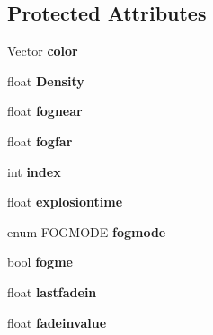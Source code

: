 \subsection*{Protected Attributes}
\begin{DoxyCompactItemize}
\item 
Vector {\bfseries color}\hypertarget{classNebula_a7b9933d103740ff9a5f5ccb587ff8bb7}{}\label{classNebula_a7b9933d103740ff9a5f5ccb587ff8bb7}

\item 
float {\bfseries Density}\hypertarget{classNebula_a65a694ecbd29a3d301b60ee90d693e55}{}\label{classNebula_a65a694ecbd29a3d301b60ee90d693e55}

\item 
float {\bfseries fognear}\hypertarget{classNebula_af826e90d2824b0609830a0f59bea4c34}{}\label{classNebula_af826e90d2824b0609830a0f59bea4c34}

\item 
float {\bfseries fogfar}\hypertarget{classNebula_a46fd435d45c344813d7ce37075083bfd}{}\label{classNebula_a46fd435d45c344813d7ce37075083bfd}

\item 
int {\bfseries index}\hypertarget{classNebula_a283a2807eb16099ac5b091f7c49dde97}{}\label{classNebula_a283a2807eb16099ac5b091f7c49dde97}

\item 
float {\bfseries explosiontime}\hypertarget{classNebula_a5e22ccf7ba5120bf784a926d1a0aa9b5}{}\label{classNebula_a5e22ccf7ba5120bf784a926d1a0aa9b5}

\item 
enum F\+O\+G\+M\+O\+DE {\bfseries fogmode}\hypertarget{classNebula_a67eedda020d65911c90facb692684d20}{}\label{classNebula_a67eedda020d65911c90facb692684d20}

\item 
bool {\bfseries fogme}\hypertarget{classNebula_a53e6f3a59a15066ef14283818dde2731}{}\label{classNebula_a53e6f3a59a15066ef14283818dde2731}

\item 
float {\bfseries lastfadein}\hypertarget{classNebula_a4905591d8ff7704492c0f0e9295dafd2}{}\label{classNebula_a4905591d8ff7704492c0f0e9295dafd2}

\item 
float {\bfseries fadeinvalue}\hypertarget{classNebula_a0fb03508878845a2a7104c098fc35335}{}\label{classNebula_a0fb03508878845a2a7104c098fc35335}

\end{DoxyCompactItemize}
